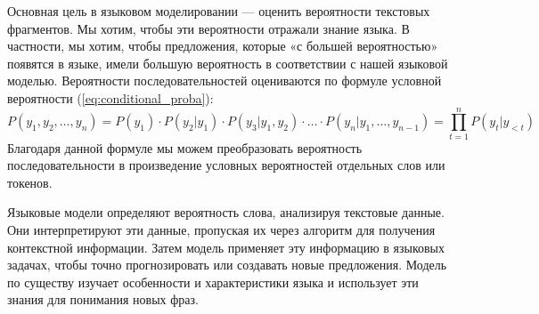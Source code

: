 Основная цель в языковом моделировании --- оценить вероятности текстовых фрагментов. Мы хотим, чтобы эти вероятности отражали знание языка. В частности, мы хотим, чтобы предложения, которые «с большей вероятностью» появятся в языке, имели большую вероятность в соответствии с нашей языковой моделью. Вероятности последовательностей оцениваются по формуле условной вероятности (\ref{eq:conditional_proba}):
\begin{equation}
	P(y_1, y_2,\dots,y_n) = P(y_1) \cdot P(y_2|y_1) \cdot P(y_3|y_1, y_2) \cdot \dots \cdot P(y_n|y_1,\dots,y_{n-1}) =
	\prod_{t=1}^n{P(y_t|y_{<t})}
	\label{eq:conditional_proba}
\end{equation}
Благодаря данной формуле мы можем преобразовать вероятность последовательности в произведение условных вероятностей отдельных слов или токенов.~\cite{lena-voita-lm}

Языковые модели определяют вероятность слова, анализируя текстовые данные. Они интерпретируют эти данные, пропуская их через алгоритм для получения контекстной информации. Затем модель применяет эту информацию в языковых задачах, чтобы точно прогнозировать или создавать новые предложения. Модель по существу изучает особенности и характеристики языка и использует эти знания для понимания новых фраз.

